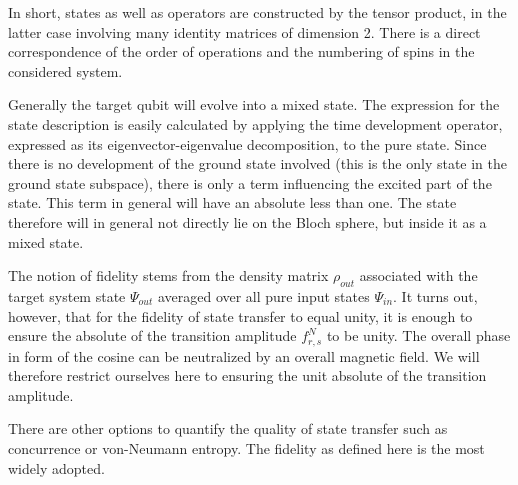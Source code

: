 \begin{center}
\end{center}

\noindent In short, states as well as operators are constructed by the tensor product, in the latter case involving many identity matrices of dimension 2. There is a direct correspondence of the order of operations and the numbering of spins in the considered system.


\begin{center}
\end{center}

\noindent Generally the target qubit will evolve into a mixed state. The expression for the state description is easily calculated by applying the time development operator, expressed as its eigenvector-eigenvalue decomposition, to the pure state. Since there is no development of the ground state involved (this is the only state in the ground state subspace), there is only a term influencing the excited part of the state. This term in general will have an absolute less than one. The state therefore will in general not directly lie on the Bloch sphere, but inside it as a mixed state.\par
The notion of fidelity stems from the density matrix $\rho_{out}$ associated with the target system state $\Psi_{out}$ averaged over all pure input states $\Psi_{in}$. It turns out, however, that for the fidelity of state transfer to equal unity, it is enough to ensure the absolute of the transition amplitude $f^N_{r,s}$ to be unity. The overall phase in form of the cosine can be neutralized by an overall magnetic field. We will therefore restrict ourselves here to ensuring the unit absolute of the transition amplitude.\par
There are other options to quantify the quality of state transfer such as concurrence or von-Neumann entropy. The fidelity as defined here is the most widely adopted.

